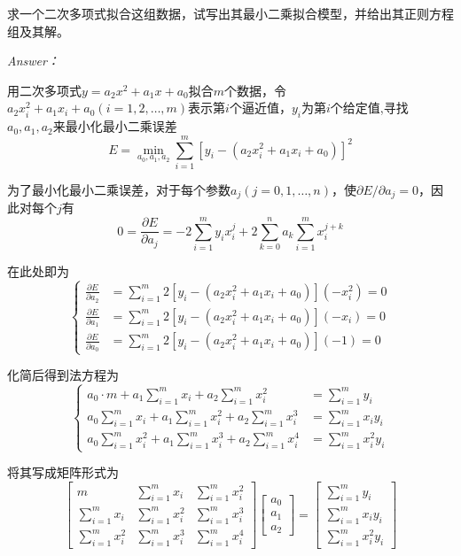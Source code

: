 \documentclass[12pt]{ctexart}
\begin{document}
	求一个二次多项式拟合这组数据，试写出其最小二乘拟合模型，并给出其正则方程组及其解。
	
	\textit{Answer：}
	
	用二次多项式$y=a_2x^2+a_1x+a_0$拟合$m$个数据，令$a_2x_i^2+a_1x_i+a_0(i=1,2,\dots,m)$表示第$i$个逼近值，$y_i$为第$i$个给定值,寻找$a_0,a_1,a_2$来最小化最小二乘误差
	\begin{equation*}
	E = \min_{a_0,a_1,a_2}\sum_{i=1}^{m}[y_i-(a_2x_i^2+a_1x_i+a_0)]^2
	\end{equation*}
	
	为了最小化最小二乘误差，对于每个参数$a_j(j=0,1,\dots,n)$，使$\partial E/\partial a_j=0$，因此对每个$j$有
	\begin{equation*}
	0=\frac{\partial E}{\partial a_j}=-2\sum_{i=1}^{m}y_ix_i^j+2\sum_{k=0}^{n}a_k\sum_{i=1}^{m}x_i^{j+k}
	\end{equation*}
	
	在此处即为
	\begin{equation*}
	\left\{
	\begin{aligned}
	\frac{\partial E}{\partial a_2}&=\sum_{i=1}^{m}2[y_i-(a_2x_i^2+a_1x_i+a_0)](-x_i^2)=0 \\
	\frac{\partial E}{\partial a_1}&=\sum_{i=1}^{m}2[y_i-(a_2x_i^2+a_1x_i+a_0)](-x_i)=0 \\
	\frac{\partial E}{\partial a_0}&=\sum_{i=1}^{m}2[y_i-(a_2x_i^2+a_1x_i+a_0)](-1)=0
	\end{aligned}
	\right.
	\end{equation*}
	
	化简后得到法方程为
	\begin{equation*}
	\left\{
	\begin{aligned}
	a_0\cdot m+a_1\sum_{i=1}^{m}x_i+a_2\sum_{i=1}^{m}x_i^2&=\sum_{i=1}^{m}y_i \\
	a_0\sum_{i=1}^{m}x_i+a_1\sum_{i=1}^{m}x_i^2+a_2\sum_{i=1}^{m}x_i^3&=\sum_{i=1}^{m}x_iy_i \\
	a_0\sum_{i=1}^{m}x_i^2+a_1\sum_{i=1}^{m}x_i^3+a_2\sum_{i=1}^{m}x_i^4&=\sum_{i=1}^{m}x_i^2y_i
	\end{aligned}
	\right.
	\end{equation*}
	
	将其写成矩阵形式为
	\[
	\begin{bmatrix}
	m&\sum\limits_{i=1}^{m}x_i&\sum\limits_{i=1}^{m}x_i^2 \\
	\sum\limits_{i=1}^{m}x_i&\sum\limits_{i=1}^{m}x_i^2&\sum\limits_{i=1}^{m}x_i^3 \\
	\sum\limits_{i=1}^{m}x_i^2&\sum\limits_{i=1}^{m}x_i^3&\sum\limits_{i=1}^{m}x_i^4
	\end{bmatrix}
	\begin{bmatrix}
	a_0 \\ a_1 \\ a_2
	\end{bmatrix}=
	\begin{bmatrix}
	\sum\limits_{i=1}^{m}y_i \\ \sum\limits_{i=1}^{m}x_iy_i \\ \sum\limits_{i=1}^{m}x_i^2y_i
	\end{bmatrix}
	\]
	
\end{document}
